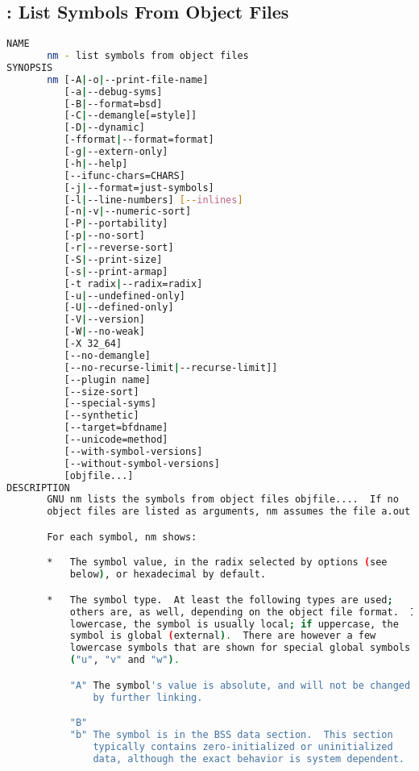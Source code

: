 % 
\subsection{: List Symbols From Object Files}

{\tiny{
\begin{lstlisting}[language=bash]
NAME
       nm - list symbols from object files
SYNOPSIS
       nm [-A|-o|--print-file-name]
          [-a|--debug-syms]
          [-B|--format=bsd]
          [-C|--demangle[=style]]
          [-D|--dynamic]
          [-fformat|--format=format]
          [-g|--extern-only]
          [-h|--help]
          [--ifunc-chars=CHARS]
          [-j|--format=just-symbols]
          [-l|--line-numbers] [--inlines]
          [-n|-v|--numeric-sort]
          [-P|--portability]
          [-p|--no-sort]
          [-r|--reverse-sort]
          [-S|--print-size]
          [-s|--print-armap]
          [-t radix|--radix=radix]
          [-u|--undefined-only]
          [-U|--defined-only]
          [-V|--version]
          [-W|--no-weak]
          [-X 32_64]
          [--no-demangle]
          [--no-recurse-limit|--recurse-limit]]
          [--plugin name]
          [--size-sort]
          [--special-syms]
          [--synthetic]
          [--target=bfdname]
          [--unicode=method]
          [--with-symbol-versions]
          [--without-symbol-versions]
          [objfile...]
DESCRIPTION
       GNU nm lists the symbols from object files objfile....  If no
       object files are listed as arguments, nm assumes the file a.out.

       For each symbol, nm shows:

       *   The symbol value, in the radix selected by options (see
           below), or hexadecimal by default.

       *   The symbol type.  At least the following types are used;
           others are, as well, depending on the object file format.  If
           lowercase, the symbol is usually local; if uppercase, the
           symbol is global (external).  There are however a few
           lowercase symbols that are shown for special global symbols
           ("u", "v" and "w").

           "A" The symbol's value is absolute, and will not be changed
               by further linking.

           "B"
           "b" The symbol is in the BSS data section.  This section
               typically contains zero-initialized or uninitialized
               data, although the exact behavior is system dependent.


\end{lstlisting}}}
